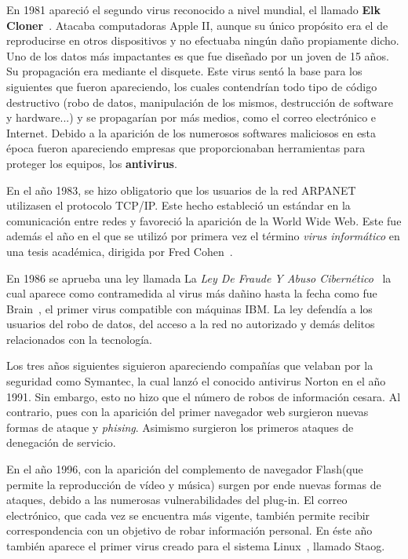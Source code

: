En 1981 apareció el segundo virus reconocido a nivel mundial, el llamado \textbf{Elk Cloner}~\cite{article:cloner}. Atacaba computadoras Apple II, aunque su único propósito era el de reproducirse en otros dispositivos y no efectuaba ningún daño propiamente dicho. Uno de los datos más impactantes es que fue diseñado por un joven de 15 años. Su propagación era mediante el disquete. 
Este virus sentó la base para los siguientes que fueron apareciendo, los cuales contendrían todo tipo de código destructivo (robo de datos, manipulación de los mismos, destrucción de software y hardware...) y se propagarían por más medios, como el correo electrónico e Internet.
Debido a la aparición de los numerosos softwares maliciosos en esta época fueron apareciendo empresas que proporcionaban herramientas para proteger los equipos, los \textbf{antivirus}.

En el año 1983, se hizo obligatorio que los usuarios de la red ARPANET utilizasen el protocolo TCP/IP. Este hecho estableció un estándar en la comunicación entre redes y favoreció la aparición de la World Wide Web.
Este fue además el año en el que se utilizó por primera vez el término \textit{virus informático} en una tesis académica, dirigida por Fred Cohen~\cite{article:cohen}.

En 1986 se aprueba una ley llamada La \textit{Ley De Fraude Y Abuso Cibernético}~\cite{article:ley} la cual aparece como contramedida al virus más dañino hasta la fecha como fue Brain~\cite{article:brain}, el primer virus compatible con máquinas IBM. La ley defendía a los usuarios del robo de datos, del acceso a la red no autorizado y demás delitos relacionados con la tecnología.

Los tres años siguientes siguieron apareciendo compañías que velaban por la seguridad como Symantec, la cual lanzó el conocido antivirus Norton en el año 1991.
Sin embargo, esto no hizo que el número de robos de información cesara. Al contrario, pues con la aparición del primer navegador web surgieron nuevas formas de ataque y \textit{phising}. Asimismo surgieron los primeros ataques de denegación de servicio.

En el año 1996, con la aparición del complemento de navegador Flash(que permite la reproducción de vídeo y música) surgen por ende nuevas formas de ataques, debido a las numerosas vulnerabilidades del plug-in. El correo electrónico, que cada vez se encuentra más vigente, también permite recibir correspondencia con un objetivo de robar información personal. En éste año también aparece el primer virus creado para el sistema Linux~\cite{article:staog}, llamado Staog.


